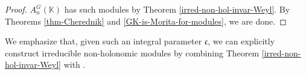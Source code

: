 \documentclass[12pt, a4paper]{amsart}
\newcommand{\discuss}[1]{{\color{orange} \textbf{[CHECK/DOUBT: #1]}}}
\newcommand{\Invar}{A_n^G(\mathbb{K})}           %
\def\c{\mathfrak c}
\begin{document}
\begin{proof}
    $\Invar$ has such modules by Theorem \ref{irred-non-hol-invar-Weyl}. By Theorems \ref{thm-Cherednik} and \ref{GK-is-Morita-for-modules}, we are done.
\end{proof}
We emphasize that, given such an integral parameter $\c$, we can explicitly construct irreducible non-holonomic modules by combining Theorem \ref{irred-non-hol-invar-Weyl} with \cite[Theorem 8.1, Lemma 8.2]{Berest}.
\appendix
\end{document}
